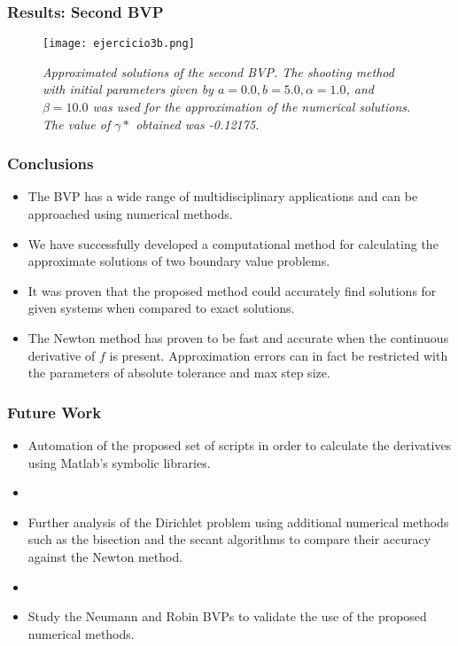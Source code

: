 \documentclass{beamer}
\begin{document}
\begin{frame}
\frametitle{Results: Second BVP}
\begin{center}
\begin{figure}
    \texttt{[image: ejercicio3b.png]}
    \caption{\textit{Approximated solutions of the second BVP. The shooting method with initial parameters given by $a = 0.0, b = 5.0, \alpha = 1.0$, and $\beta = 10.0$ was used for the approximation of the numerical solutions. The value of $\gamma*$ obtained was -0.12175.}}
\end{figure}
\end{center}
\end{frame}
\begin{frame}
\frametitle{Conclusions}
\begin{itemize}
    \item The BVP has a wide range of multidisciplinary applications and can be approached using numerical methods.
    \item We have successfully developed a computational method for calculating the approximate solutions of two boundary value problems.
    \item It was proven that the proposed method could accurately find solutions for given systems when compared to exact solutions.
    \item The Newton method has proven to be fast and accurate when the continuous derivative of $f$ is present. Approximation errors can in fact be restricted with the parameters of absolute tolerance and max step size.
\end{itemize}
\end{frame}
\begin{frame}
\frametitle{Future Work}
\begin{itemize}
    \item Automation of the proposed set of scripts in order to calculate the derivatives using Matlab's symbolic libraries.
    \item[] 
    \item Further analysis of the Dirichlet problem using additional numerical methods such as the bisection and the secant algorithms to compare their accuracy against the Newton method.
    \item[] 
    \item Study the Neumann and Robin BVPs to validate the use of the proposed numerical methods.
\end{itemize}
\end{frame}
\end{document}
